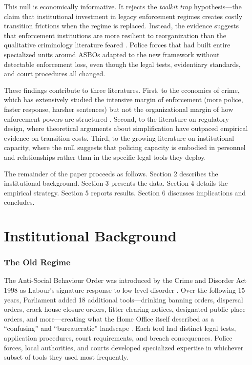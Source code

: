 \documentclass[12pt]{article}
\begin{document}
This null is economically informative. It rejects the \textit{toolkit trap} hypothesis---the claim that institutional investment in legacy enforcement regimes creates costly transition frictions when the regime is replaced. Instead, the evidence suggests that enforcement institutions are more resilient to reorganization than the qualitative criminology literature feared \citep{mceachern2018}. Police forces that had built entire specialized units around ASBOs adapted to the new framework without detectable enforcement loss, even though the legal tests, evidentiary standards, and court procedures all changed.

These findings contribute to three literatures. First, to the economics of crime, which has extensively studied the intensive margin of enforcement (more police, faster response, harsher sentences) but not the organizational margin of how enforcement powers are structured \citep{chalfin2015, nagin2013}. Second, to the literature on regulatory design, where theoretical arguments about simplification \citep{becker1968} have outpaced empirical evidence on transition costs. Third, to the growing literature on institutional capacity, where the null suggests that policing capacity is embodied in personnel and relationships rather than in the specific legal tools they deploy.

The remainder of the paper proceeds as follows. Section 2 describes the institutional background. Section 3 presents the data. Section 4 details the empirical strategy. Section 5 reports results. Section 6 discusses implications and concludes.


\section{Institutional Background}

\subsubsection*{The Old Regime} The Anti-Social Behaviour Order was introduced by the Crime and Disorder Act 1998 as Labour's signature response to low-level disorder \citep{burney2002}. Over the following 15 years, Parliament added 18 additional tools---drinking banning orders, dispersal orders, crack house closure orders, litter clearing notices, designated public place orders, and more---creating what the Home Office itself described as a ``confusing'' and ``bureaucratic'' landscape \citep{homeoffice2014guide}. Each tool had distinct legal tests, application procedures, court requirements, and breach consequences. Police forces, local authorities, and courts developed specialized expertise in whichever subset of tools they used most frequently.
\end{document}
